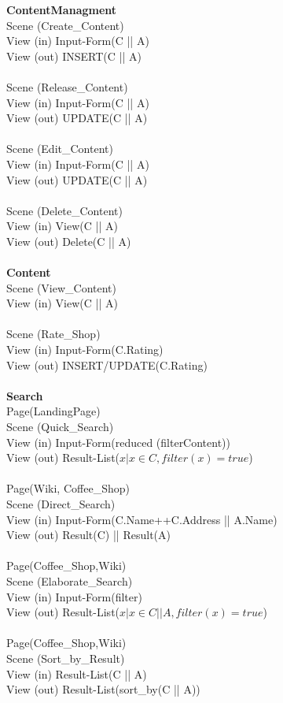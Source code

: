 \textbf{ContentManagment}\\
Scene (Create\_Content)\\
View (in)   Input-Form(C || A)\\
View (out)  INSERT(C || A)\\
\\
Scene (Release\_Content)\\
View (in)   Input-Form(C || A)\\
View (out)  UPDATE(C || A)\\
\\
Scene (Edit\_Content)\\
View (in)   Input-Form(C || A)\\
View (out)  UPDATE(C || A)\\
\\
Scene (Delete\_Content)\\
View (in)   View(C || A)\\
View (out)  Delete(C || A)\\
\\


\textbf{Content}\\
Scene (View\_Content)\\
View (in)   View(C || A)\\
\\
Scene (Rate\_Shop)\\
View (in)   Input-Form(C.Rating)\\
View (out)  INSERT/UPDATE(C.Rating)\\
\\




\textbf{Search}\\
Page(LandingPage)\\
Scene (Quick\_Search)\\
View (in)   Input-Form(reduced (filterContent))\\
View (out)  Result-List(${x| x \in C, filter(x)=true}$)\\
\\
Page(Wiki, Coffee\_Shop)\\
Scene (Direct\_Search)\\
View (in)   Input-Form(C.Name++C.Address || A.Name)\\
View (out)  Result(C) || Result(A)\\
\\
Page(Coffee\_Shop,Wiki)\\
Scene (Elaborate\_Search)\\
View (in)   Input-Form(filter)\\
View (out)  Result-List(${x| x \in C || A, filter(x)=true}$)\\
\\
Page(Coffee\_Shop,Wiki)\\
Scene (Sort\_by\_Result)\\
View (in)   Result-List(C || A)\\
View (out)  Result-List(sort\_by(C || A))\\
\\\\


